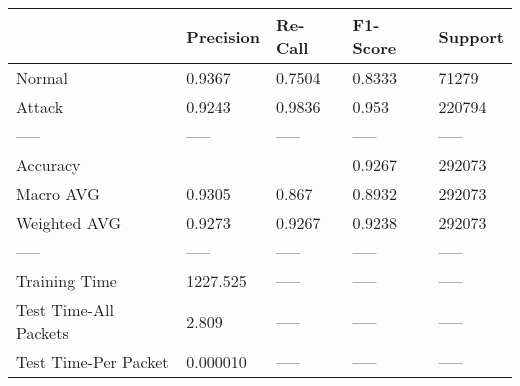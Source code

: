 \begin{tabular}{lllll}
\toprule
{} & Precision & Re-Call & F1-Score & Support \\
\midrule
Normal                &    0.9367 &  0.7504 &   0.8333 &   71279 \\
Attack                &    0.9243 &  0.9836 &    0.953 &  220794 \\
-----                 &     ----- &   ----- &    ----- &   ----- \\
Accuracy              &           &         &   0.9267 &  292073 \\
Macro AVG             &    0.9305 &   0.867 &   0.8932 &  292073 \\
Weighted AVG          &    0.9273 &  0.9267 &   0.9238 &  292073 \\
-----                 &     ----- &   ----- &    ----- &   ----- \\
Training Time         &  1227.525 &   ----- &    ----- &   ----- \\
Test Time-All Packets &     2.809 &   ----- &    ----- &   ----- \\
Test Time-Per Packet  &  0.000010 &   ----- &    ----- &   ----- \\
\bottomrule
\end{tabular}
